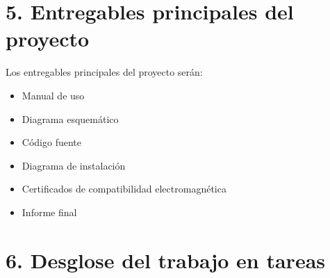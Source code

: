 \documentclass[11pt]{charter}
\begin{document}
\section{5. Entregables principales del proyecto}
\label{sec:entregables}

Los entregables principales del proyecto serán:
\begin{itemize}
\item Manual de uso
\item Diagrama esquemático
\item Código fuente
\item Diagrama de instalación
\item Certificados de compatibilidad electromagnética
\item Informe final

\end{itemize}


\section{6. Desglose del trabajo en tareas}
\label{sec:wbs}
\end{document}
